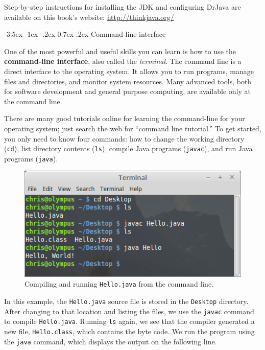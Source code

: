 \documentclass[12pt]{book}
\makeatletter
\theoremstyle{exercise}
\renewcommand{\section}{\@startsection {section}{1}{\z@}%
    {-3.5ex \@plus -1ex \@minus -.2ex}%
    {0.7ex \@plus.2ex}%
    {\normalfont\Large\bfseries}}
\makeatother
\begin{document}
Step-by-step instructions for installing the JDK and configuring DrJava are available on this book's website: \url{http://thinkjava.org/}


\section{Command-line interface}


One of the most powerful and useful skills you can learn is how to use the {\bf command-line interface}, also called the {\em terminal}.
The command line is a direct interface to the operating system.
It allows you to run programs, manage files and directories, and monitor system resources.
Many advanced tools, both for software development and general purpose computing, are available only at the command line.

There are many good tutorials online for learning the command-line for your operating system; just search the web for ``command line tutorial.''
To get started, you only need to know four commands: how to change the working directory ({\tt cd}), list directory contents ({\tt ls}), compile Java programs ({\tt javac}), and run Java programs ({\tt java}).


\begin{figure}[!h]
\begin{center}
\includegraphics[width=4.5in]{figs/terminal.png}
\caption{Compiling and running {\tt Hello.java} from the command line.}
\end{center}
\end{figure}

In this example, the {\tt Hello.java} source file is stored in the {\tt Desktop} directory.
After changing to that location and listing the files, we use the {\tt javac} command to compile {\tt Hello.java}.
Running {\tt ls} again, we see that the compiler generated a new file, {\tt Hello.class}, which contains the byte code.
We run the program using the {\tt java} command, which displays the output on the following line.
\end{document}
